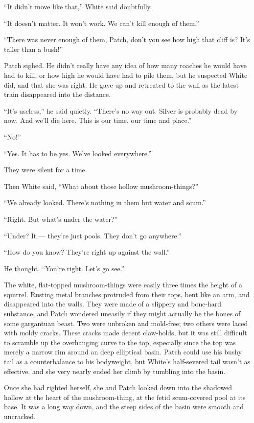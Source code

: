 \documentclass[ebook,oneside,openany,12pt]{memoir}
\begin{document}
“It didn’t move like that,” White said doubtfully.

“It doesn’t matter. It won’t work. We can’t kill enough of them.”

“There was never enough of them, Patch, don’t you see how high that
cliff is? It’s taller than a bush!”

Patch sighed. He didn’t really have any idea of how many roaches he
would have had to kill, or how high he would have had to pile them,
but he suspected White did, and that she was right. He gave up and
retreated to the wall as the latest train disappeared into the
distance.

“It’s useless,” he said quietly. “There’s no way out. Silver is
probably dead by now. And we’ll die here. This is our time, our time
and place.”

“No!”

“Yes. It has to be yes. We’ve looked everywhere.”

They were silent for a time.

Then White said, “What about those hollow mushroom-things?”

“We already looked. There’s nothing in them but water and scum.”

“Right. But what’s under the water?”

“Under? It — they’re just pools. They don’t go anywhere.”

“How do you know? They’re right up against the wall.”

He thought. “You’re right. Let’s go see.”

The white, flat-topped mushroom-things were easily three times the
height of a squirrel. Rusting metal branches protruded from their
tops, bent like an arm, and disappeared into the walls. They were made
of a slippery and bone-hard substance, and Patch wondered uneasily if
they might actually be the bones of some gargantuan beast. Two were
unbroken and mold-free; two others were laced with moldy cracks. These
cracks made decent claw-holds, but it was still difficult to scramble
up the overhanging curve to the top, especially since the top was
merely a narrow rim around an deep elliptical basin. Patch could use
his bushy tail as a counterbalance to his bodyweight, but White’s
half-severed tail wasn’t as effective, and she very nearly ended her
climb by tumbling into the basin.

Once she had righted herself, she and Patch looked down into the
shadowed hollow at the heart of the mushroom-thing, at the fetid
scum-covered pool at its base. It was a long way down, and the steep
sides of the basin were smooth and uncracked.
\end{document}
